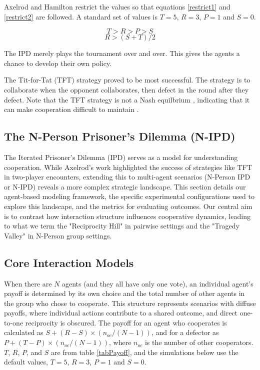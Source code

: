 \documentclass[]{llncs} %
\begin{document}
Axelrod and Hamilton restrict the values so that equations \ref {restrict1}
and \ref {restrict2} are followed.  A standard set of values is $T=5$, $R=3$,
$P=1$ and $S=0$.

\begin{equation}\label{restrict1}
T > R > P > S 
\end{equation}
\begin{equation}\label{restrict2}
R > (S + T) / 2
\end{equation}

The IPD merely plays the tournament over and over.  This gives the agents
a chance to develop their own policy.

The Tit-for-Tat (TFT) strategy proved to be most successful.  The
strategy is to collaborate when the opponent collaborates, then
defect in the round after they defect.  Note that the TFT strategy
is not a Nash equilbrium \cite {Nash}, indicating that it can make
cooperation difficult to maintain \cite {Holt}.

\subsection{The N-Person Prisoner's Dilemma (N-IPD)}

The Iterated Prisoner's Dilemma (IPD) serves as a model for
understanding cooperation. While Axelrod's work highlighted the
success of strategies like TFT in two-player encounters,
extending this to multi-agent scenarios (N-Person IPD or N-IPD)
reveals a more complex strategic landscape. This section details our
agent-based modeling framework, the specific experimental
configurations used to explore this landscape, and the metrics for
evaluating outcomes. Our central aim is to contrast how interaction
structure influences cooperative dynamics, leading to what we term the
"Reciprocity Hill" in pairwise settings and the "Tragedy Valley" in
N-Person group settings.

\subsection{Core Interaction Models}
When there are $N$ agents (and they all have only one vote), 
an individual agent's payoff is determined by its
own choice and the total number of other agents in the group who
chose to cooperate. This structure represents scenarios with diffuse
payoffs, where individual actions contribute to a shared outcome, and
direct one-to-one reciprocity is obscured. The payoff for an agent who
cooperates is calculated as $S + (R - S) \times (n_{oc} / (N - 1))$,
and for a defector as $P + (T - P) \times (n_{oc} / (N - 1))$, where
$n_{oc}$ is the number of other cooperators. $T$, $R$, $P$, and $S$ are
from table \ref {tabPayoff}, and the simulations below use the default values,
$T=5$, $R=3$, $P=1$ and $S=0$.
\end{document}

